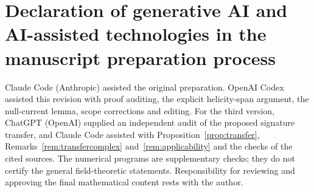 \section*{Declaration of generative AI and AI-assisted technologies in the manuscript preparation process}

Claude Code (Anthropic) assisted the original preparation. OpenAI Codex assisted this revision with proof auditing, the explicit helicity-span argument, the null-current lemma, scope corrections and editing. For the third version, ChatGPT (OpenAI) supplied an independent audit of the proposed signature transfer, and Claude Code assisted with Proposition~\ref{prop:transfer}, Remarks~\ref{rem:transfercomplex} and~\ref{rem:applicability} and the checks of the cited sources. The numerical programs are supplementary checks; they do not certify the general field-theoretic statements. Responsibility for reviewing and approving the final mathematical content rests with the author.

